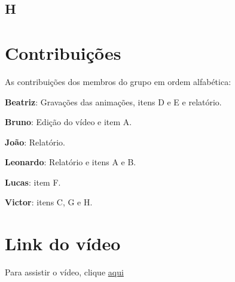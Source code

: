 \documentclass[a4paper, 12pt]{article}
\begin{document}
\subsection*{H}


\section*{Contribuições}
As contribuições dos membros do grupo em ordem alfabética:

\textbf{Beatriz}: Gravações das animações, itens D e E e relatório.

\textbf{Bruno}: Edição do vídeo e item A.

\textbf{João}: Relatório.

\textbf{Leonardo}: Relatório e itens A e B.

\textbf{Lucas}: item F.

\textbf{Victor}: itens C, G e H.

\section*{Link do vídeo}
Para assistir o vídeo, clique
\href{https://www.youtube.com/watch?v=Tx7dhtJjCZc&feature=youtu.be}{aqui}
\end{document}
